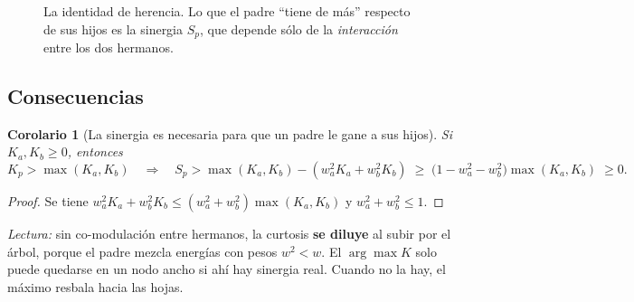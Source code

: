 \documentclass[11pt,a4paper]{article}
\newtheorem{corolario}{Corolario}
\theoremstyle{definition}
\theoremstyle{remark}
\begin{document}
\begin{figure}[!htb]
\centering
{}
\caption{La identidad de herencia. Lo que el padre ``tiene de más'' respecto de sus hijos es la sinergia $S_p$, que depende sólo de la \emph{interacción} entre los dos hermanos.}
\label{fig:diagrama}
\end{figure}

\subsection{Consecuencias}

\begin{corolario}[La sinergia es necesaria para que un padre le gane a sus hijos]\label{cor:sesgo}
Si $K_a,K_b\ge0$, entonces
\[
K_p>\max(K_a,K_b)\quad\Longrightarrow\quad S_p>\max(K_a,K_b)-(w_a^2K_a+w_b^2K_b)\;\ge\;\big(1-w_a^2-w_b^2\big)\max(K_a,K_b)\;\ge 0 .
\]
\end{corolario}
\begin{proof}
Se tiene $w_a^2K_a+w_b^2K_b\le(w_a^2+w_b^2)\max(K_a,K_b)$ y $w_a^2+w_b^2\le 1$.
\end{proof}
\noindent\emph{Lectura:} sin co-modulación entre hermanos, la curtosis \textbf{se diluye} al subir por el árbol, porque el padre mezcla energías con pesos $w^2<w$. El $\arg\max K$ solo puede quedarse en un nodo ancho si ahí hay sinergia real. Cuando no la hay, el máximo resbala hacia las hojas.
\end{document}
